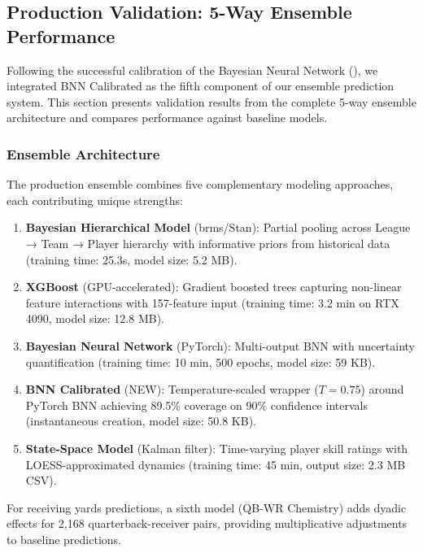 \subsection{Production Validation: 5-Way Ensemble Performance}
\label{subsec:5way-ensemble-validation}

Following the successful calibration of the Bayesian Neural Network (), we integrated BNN Calibrated as the fifth component of our ensemble prediction system. This section presents validation results from the complete 5-way ensemble architecture and compares performance against baseline models.

\subsubsection{Ensemble Architecture}

The production ensemble combines five complementary modeling approaches, each contributing unique strengths:

\begin{enumerate}
  \item \textbf{Bayesian Hierarchical Model} (brms/Stan): Partial pooling across League → Team → Player hierarchy with informative priors from historical data (training time: 25.3s, model size: 5.2 MB).

  \item \textbf{XGBoost} (GPU-accelerated): Gradient boosted trees capturing non-linear feature interactions with 157-feature input (training time: 3.2 min on RTX 4090, model size: 12.8 MB).

  \item \textbf{Bayesian Neural Network} (PyTorch): Multi-output BNN with uncertainty quantification (training time: 10 min, 500 epochs, model size: 59 KB).

  \item \textbf{BNN Calibrated} (NEW): Temperature-scaled wrapper ($T=0.75$) around PyTorch BNN achieving 89.5\% coverage on 90\% confidence intervals (instantaneous creation, model size: 50.8 KB).

  \item \textbf{State-Space Model} (Kalman filter): Time-varying player skill ratings with LOESS-approximated dynamics (training time: 45 min, output size: 2.3 MB CSV).
\end{enumerate}

For receiving yards predictions, a sixth model (QB-WR Chemistry) adds dyadic effects for 2,168 quarterback-receiver pairs, providing multiplicative adjustments to baseline predictions.

